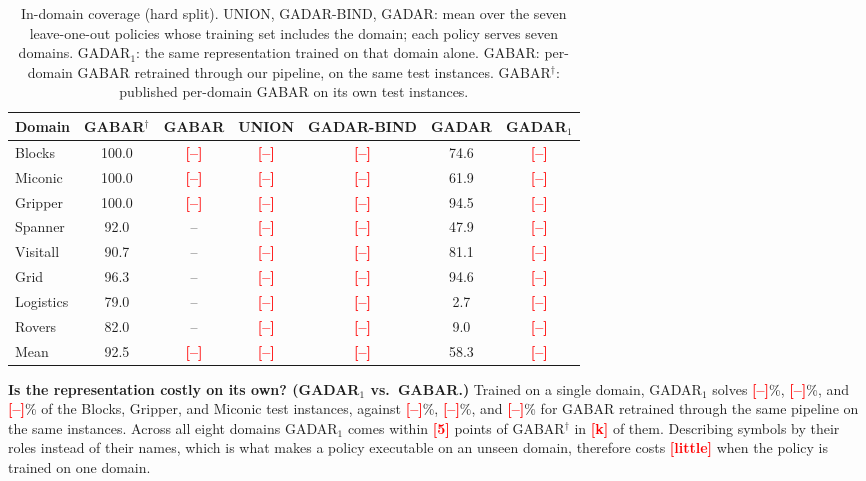 \documentclass[letterpaper]{article} %
\newcommand{\gadar}{GADAR}                 %
\newcommand{\gadarbind}{\gadar{}-BIND}     %
\newcommand{\union}{UNION}                 %
\newcommand{\todonum}[1]{\textcolor{red}{\textbf{[#1]}}}
\begin{document}
\begin{table}[t]
\setlength{\tabcolsep}{4pt}
\renewcommand{\arraystretch}{1.1}
\small
\centering
\caption{In-domain coverage (hard split). \union{}, \gadarbind{},
\gadar{}: mean over the seven leave-one-out policies whose training set
includes the domain; each policy serves seven domains. \gadar{}$_1$: the
same representation trained on that domain alone. GABAR: per-domain GABAR
retrained through our pipeline, on the same test instances.
GABAR$^\dagger$: published per-domain GABAR on its own test instances.}
\label{table:indomain}
\begin{tabular}{@{}l|cc|ccc|c@{}}
\toprule
Domain & GABAR$^\dagger$ & GABAR & \union{} & \gadarbind{} & \gadar{} & \gadar{}$_1$ \\
\midrule
Blocks    & 100.0 & \todonum{--} & \todonum{--} & \todonum{--} & 74.6 & \todonum{--} \\
Miconic   & 100.0 & \todonum{--} & \todonum{--} & \todonum{--} & 61.9 & \todonum{--} \\
Gripper   & 100.0 & \todonum{--} & \todonum{--} & \todonum{--} & 94.5 & \todonum{--} \\
Spanner   & 92.0  & --           & \todonum{--} & \todonum{--} & 47.9 & \todonum{--} \\
Visitall  & 90.7  & --           & \todonum{--} & \todonum{--} & 81.1 & \todonum{--} \\
Grid      & 96.3  & --           & \todonum{--} & \todonum{--} & 94.6 & \todonum{--} \\
Logistics & 79.0  & --           & \todonum{--} & \todonum{--} & 2.7  & \todonum{--} \\
Rovers    & 82.0  & --           & \todonum{--} & \todonum{--} & 9.0  & \todonum{--} \\
\midrule
Mean      & 92.5  & \todonum{--} & \todonum{--} & \todonum{--} & 58.3 & \todonum{--} \\
\bottomrule
\end{tabular}
\end{table}

\textbf{Is the representation costly on its own? (\gadar{}$_1$ vs.\ GABAR.)}
Trained on a single domain, \gadar{}$_1$ solves \todonum{--}\%,
\todonum{--}\%, and \todonum{--}\% of the Blocks, Gripper, and Miconic test
instances, against \todonum{--}\%, \todonum{--}\%, and \todonum{--}\% for
GABAR retrained through the same pipeline on the same instances. Across all
eight domains \gadar{}$_1$ comes within \todonum{5} points of
GABAR$^\dagger$ in \todonum{k} of them. Describing symbols by their roles
instead of their names, which is what makes a policy executable on an unseen
domain, therefore costs \todonum{little} when the policy is trained on one
domain.
\end{document}
